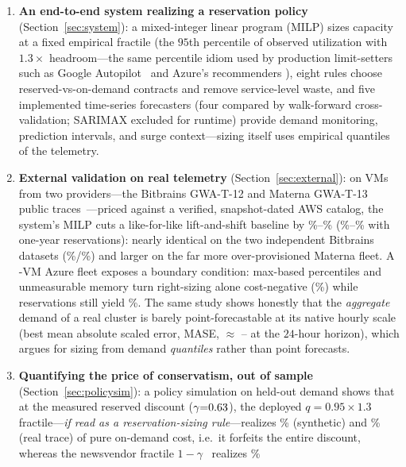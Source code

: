 \documentclass[10pt,journal]{IEEEtran}
\begin{document}
\begin{enumerate}
\item \textbf{An end-to-end system realizing a reservation policy}
(Section~\ref{sec:system}): a mixed-integer linear program (MILP) sizes
capacity at a fixed empirical fractile (the $95$th percentile of observed
utilization with $1.3\times$ headroom---the same percentile idiom used by
production limit-setters such as Google Autopilot~\cite{rzadca2020autopilot}
and Azure's recommenders \cite{cortez2017resource,cahoon2022doppler}), eight
rules choose reserved-vs-on-demand contracts and remove service-level waste,
and five implemented time-series forecasters (four compared by walk-forward
cross-validation; SARIMAX excluded for runtime) provide demand monitoring,
prediction intervals, and surge context---sizing itself uses empirical
quantiles of the telemetry.
\item \textbf{External validation on real telemetry}
(Section~\ref{sec:external}): on \extTotalVms{} VMs from two providers---the
Bitbrains GWA-T-12 and Materna GWA-T-13 public
traces~\cite{shen2015bitbrains,iosup2008gwa}---priced against a verified,
snapshot-dated AWS catalog, the system's MILP cuts a like-for-like
lift-and-shift baseline by \extRndSavingsPct\%--\extMatSavingsPct\%
(\extRndSavingsPctRi\%--\extMatSavingsPctRi\% with one-year reservations):
nearly identical on the two independent Bitbrains datasets
(\extFsSavingsPct\%/\extRndSavingsPct\%) and larger on the far more
over-provisioned Materna fleet. A \azVms-VM Azure fleet exposes a boundary
condition: max-based percentiles and unmeasurable memory turn right-sizing
alone cost-negative (\azSavingsPct\%) while reservations still yield
\azSavingsPctRi\%. The
same study shows honestly that the \emph{aggregate} demand of a real
cluster is barely point-forecastable at its native hourly scale (best mean
absolute scaled error, MASE, $\approx$ \extMaseNaive--\extMaseEts{} at the
$24$-hour horizon), which argues for sizing from demand \emph{quantiles}
rather than point forecasts.
\item \textbf{Quantifying the price of conservatism, out of sample}
(Section~\ref{sec:policysim}): a policy simulation on held-out demand shows
that at the measured reserved discount ($\gamma{=}0.63$), the
deployed $q{=}0.95{\times}1.3$
fractile---\emph{if read as a reservation-sizing rule}---realizes
\polPctHeur\% (synthetic) and \extPolPctHeur\% (real trace) of pure on-demand
cost, i.e.\ it forfeits the entire discount, whereas the newsvendor fractile
$1{-}\gamma$~\cite{arrow1951inventory,ban2019newsvendor} realizes \polPctNv\%

\end{enumerate}
\end{document}
